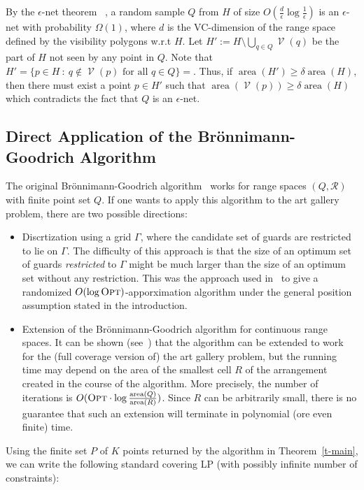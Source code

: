 \documentclass[a4paper,11pt]{article}
\def\cR{\mathcal R}
\def\cV{\mathcal V}
\newcommand{\area}{\operatorname{area}}
\newcommand{\Vis}{\operatorname{\cV}}
\def \OPT {\textsc{Opt}}
\begin{document}
By the $\epsilon$-net theorem~\cite{HW87,KPW92} , a random sample $Q$ from $H$ of size $O(\frac{d}{\epsilon}\log\frac{1}{\epsilon})$ is an $\epsilon$-net with probability $\Omega(1)$, where $d$ is the VC-dimension of the range space defined by the visibility polygons w.r.t $H$.  Let $H':=H\setminus \bigcup_{q\in Q}\Vis(q)$ be the part of $H$ not seen by any point in $Q$. Note that $H'=\{p\in H~:~q\not\in\Vis(p)\text{ for all }q\in Q\}=$. Thus, if $\area(H')\geq\delta\area(H)$, then there must exist a point $p\in H'$ such that $\area(\Vis(p))\ge\delta\area(H)$ which contradicts the fact that $Q$ is an $\epsilon$-net.  
\fi
\subsection{Direct Application of the Br\"{o}nnimann-Goodrich Algorithm }\label{sec:BG}

The original Br\"{o}nnimann-Goodrich algorithm~\cite{BG95}  works for range spaces $(Q,\cR)$ with finite point set $Q$. If one wants to apply this algorithm to the art gallery problem, there are two possible directions:  

\begin{itemize}
	\item Discrtization using a grid $\Gamma$, where the candidate set of guards are restricted to lie on $\Gamma$. The difficulty of this approach is that the size of an optimum set of guards {\it restricted} to $\Gamma$ might be much larger than the size of an optimum set without any restriction. This was the approach used in~\cite{BM16} to give a randomized $O(\log \OPT)$-apporximation algorithm under the general position assumption stated in the introduction.
	
	\item Extension of the Br\"{o}nnimann-Goodrich algorithm for continuous range spaces. It can be shown (see~\cite{E16}) that the algorithm can be extended to work for the  (full coverage version of) the art gallery problem, but the running time may depend on the area of the smallest cell $R$ of the arrangement created in the course of the algorithm. More precisely, the number of iterations is $O(\OPT\cdot\log\frac{\area(Q)}{\area(R)})$. Since $R$ can be arbitrarily small, there is no guarantee that such an extension will terminate in polynomial (ore even finite) time.    
\end{itemize}
\iffalse
Using the  finite set $P$ of $K$ points returned by the algorithm in Theorem~\ref{t-main}, we can write the following standard  covering LP (with possibly infinite number of constraints):
\end{document}
